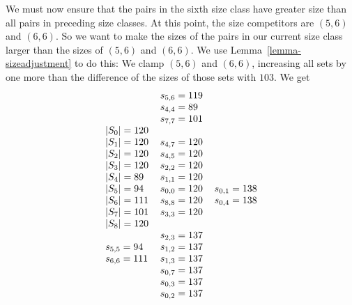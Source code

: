 \documentclass[letterpaper]{article} %
\theoremstyle{definition}
\begin{document}
We must now ensure that the pairs in the sixth size class have greater size than all pairs in preceding size classes.  At this point, the size competitors are $(5,6)$ and $(6,6)$.  So we want to make the sizes of the pairs in our current size class larger than the sizes of $(5,6)$ and $(6,6)$.  We use Lemma~\ref{lemma-sizeadjustment} to do this:  We clamp $(5,6)$ and $(6,6)$, increasing all sets by
one more than the difference of the sizes of those sets with $103$.
We get
\[
\arraycolsep=3.0pt
\begin{array}[t]{lllll}
 \begin{array}{l}
|S_0| = 120 \\
|S_1| = 120 \\
|S_2| = 120 \\
|S_3| = 120 \\
|S_4| = 89 \\
|S_5| = 94 \\
|S_6| = 111 \\
|S_7| = 101 \\
|S_8| = 120 \\
\\
s_{5, 5} = 94 \\
s_{6, 6} = 111 \\
\end{array}
 &
\begin{array}{l}
s_{5, 6} = 119 \\
s_{4, 4} = 89 \\
s_{7, 7} = 101 \\
\\
s_{4, 7} = 120 \\
s_{4, 5} = 120 \\
s_{2, 2} = 120 \\
s_{1, 1} = 120 \\
s_{0, 0} = 120 \\
s_{8, 8} = 120 \\
s_{3, 3} = 120 \\
\\
s_{2, 3} = 137 \\
s_{1, 2} = 137 \\
s_{1, 3} = 137 \\
s_{0, 7} = 137 \\
s_{0, 3} = 137 \\
s_{0, 2} = 137 \\
 \end{array}
&
  \begin{array}{l}
s_{0, 1} = 138 \\
s_{0, 4} = 138 \\

\end{array}
\end{array}\]
\end{document}
